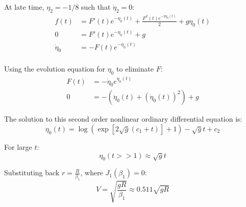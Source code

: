 At late time, $\eta_2 = -1/8$ such that $\dot\eta_2 = 0$:
\begin{align}
f(t) &= F'(t) e^{-\eta_0(t)} + \frac{F^2(t) e^{-2\eta_0(t)}}{2} + g \eta_0(t)  \\
0 &=  F'(t) e^{-\eta_0(t)}  + g  \\
\dot\eta_0  &= - F(t)  e^{-\eta_0(t)}  \\
\end{align}

Using the evolution equation for $\eta_0$ to eliminate $F$:
\begin{align}
F(t) &= -\dot\eta_0 e^{\eta_0(t)}    \\
0 &= -\left(\ddot\eta_0(t)+(\dot\eta_0(t))^2\right) + g 
\end{align}

The solution to this second order nonlinear ordinary differential equation is:
\begin{equation}
\eta_0(t) = \log\left( \exp\left[2 \sqrt{g} (c_1 + t) \right] + 1 \right) - \sqrt{g}t + c_2
\end{equation}

For large $t$:
\begin{equation}
\eta_0(t>>1) \approx  \sqrt{g}t 
\end{equation}

Substituting back $r = \frac{R}{\beta_1}$, where $J_1(\beta_1) = 0$:
\begin{equation}
V = \sqrt{\frac{g R}{\beta_1}} \approx 0.511 \sqrt{g R}
\end{equation}


